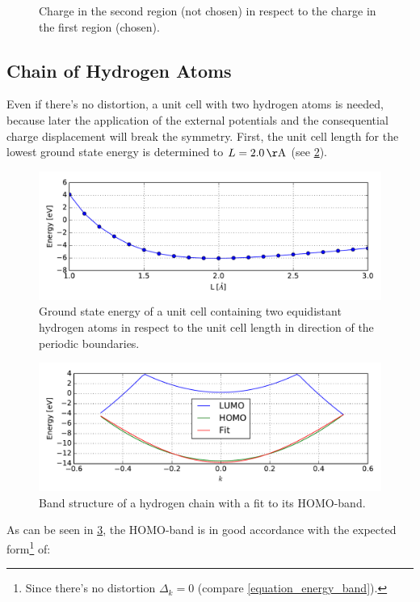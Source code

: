 \begin{figure}
\begin{minipage}{0.49\textwidth}
\caption{Charge in the second region (not chosen) in respect to the charge in the first region (chosen).\\}
\label{image_charge_correlation}
\end{minipage}
\end{figure}

\subsection{Chain of Hydrogen Atoms}
\label{section_hydrogen_chain}
Even if there's no distortion, a unit cell with two hydrogen atoms is needed, because later the application of the external potentials and the consequential charge displacement will break the symmetry. First, the unit cell length for the lowest ground state energy is determined to $L = \unit[2.0]{\AA}$ (see \cref{image_hydrogen_unit_cell_length}).
\begin{figure}[]
	\centering
	\includegraphics[width = 12cm]{Images/Hydrogen/convergence/hydrogen_length}
	\caption{Ground state energy of a unit cell containing two equidistant hydrogen atoms in respect to the unit cell length in direction of the periodic boundaries.}
	\label{image_hydrogen_unit_cell_length}
\end{figure}
\begin{figure}[]
	\centering
	\includegraphics[width = 12cm]{Images/Hydrogen/bands/hydrogen_band_structure}
	\caption{Band structure of a hydrogen chain with a fit to its HOMO-band.}
	\label{image_hydrogen_band_structure}
\end{figure}
\newpage
As can be seen in \cref{image_hydrogen_band_structure}, the HOMO-band is in good accordance with the expected form\footnote{Since there's no distortion $\Delta_k = 0$ (compare \cref{equation_energy_band}).} of:
